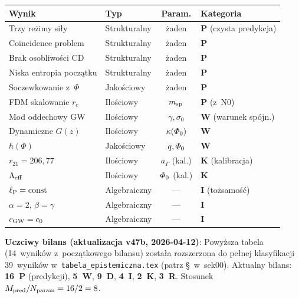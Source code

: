 \begin{remark}
\medskip
\begin{center}\small
\begin{tabular}{@{}llcl@{}}
\toprule
\textbf{Wynik} & \textbf{Typ} & \textbf{Param.} & \textbf{Kategoria} \\
\midrule
Trzy re\.zimy si\l{}y    & Strukturalny & \.zaden & \textbf{P} (czysta predykcja) \\
Coincidence problem     & Strukturalny & \.zaden & \textbf{P} \\
Brak osobliwo\'sci CD   & Strukturalny & \.zaden & \textbf{P} \\
Niska entropia pocz\k{a}tku & Strukturalny & \.zaden & \textbf{P} \\
Soczewkowanie z~$\Phi$  & Jako\'sciowy  & \.zaden & \textbf{P} \\
FDM skalowanie $r_c$    & Ilo\'sciowy   & $m_{\rm sp}$  & \textbf{P} (z~N0) \\
\midrule
Mod oddechowy GW        & Ilo\'sciowy   & $\gamma, \sigma_0$ & \textbf{W} (warunek sp\'ojn.) \\
Dynamiczne $G(z)$       & Ilo\'sciowy   & $\kappa(\varPhi_0)$ & \textbf{W} \\
$\hbar(\Phi)$           & Jako\'sciowy  & $q, \varPhi_0$      & \textbf{W} \\
$r_{21} = 206{,}77$     & Ilo\'sciowy   & $a_\Gamma$ (kal.) & \textbf{K} (kalibracja) \\
$\Lambda_{\rm eff}$     & Ilo\'sciowy   & $\varPhi_0$ (kal.) & \textbf{K} \\
\midrule
$\ell_{\mathrm{P}} = \mathrm{const}$    & Algebraiczny & --- & \textbf{I} (to\.zsamo\'s\'c) \\
$\alpha = 2$, $\beta=\gamma$ & Algebraiczny & --- & \textbf{I} \\
$c_{\rm GW} = c_0$        & Algebraiczny & --- & \textbf{I} \\
\bottomrule
\end{tabular}
\end{center}

\noindent\textbf{Uczciwy bilans (aktualizacja v47b, 2026-04-12)}:
Powy\.zsza tabela (14~wynik\'ow z~pocz\k{a}tkowego bilansu)
zosta\l{}a rozszerzona do pe\l{}nej klasyfikacji 39~wynik\'ow
w~\texttt{tabela\_epistemiczna.tex}
(patrz \S\, w~sek00).
Aktualny bilans:
\textbf{16~P} (predykcji), \textbf{5~W}, \textbf{9~D},
\textbf{4~I}, \textbf{2~K}, \textbf{3~R}.
Stosunek $M_{\rm pred}/N_{\rm param} = 16/2 = 8$.


\end{remark}
